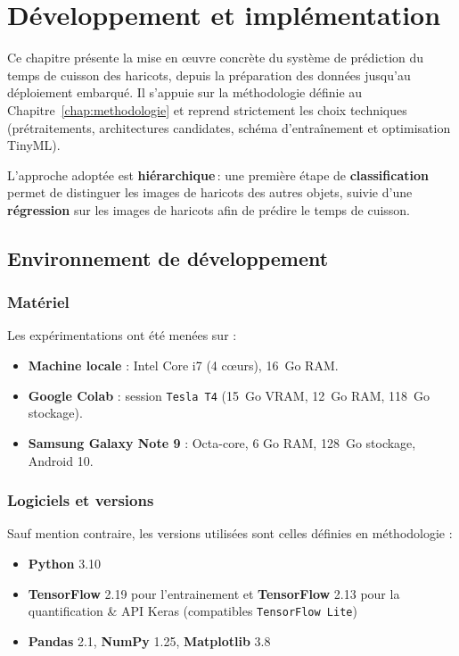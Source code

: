 \chapter{Développement et implémentation}
\label{chap:developpement}

Ce chapitre présente la mise en œuvre concrète du système de prédiction du temps de cuisson des haricots, depuis la préparation des données jusqu’au déploiement embarqué. Il s’appuie sur la méthodologie définie au Chapitre~\ref{chap:methodologie} et reprend strictement les choix techniques (prétraitements, architectures candidates, schéma d’entraînement et optimisation TinyML).

L’approche adoptée est \textbf{hiérarchique} : une première étape de \textbf{classification} permet de distinguer les images de haricots des autres objets, suivie d’une \textbf{régression} sur les images de haricots afin de prédire le temps de cuisson.

\section{Environnement de développement}
\label{sec:env_dev}

\subsection{Matériel}
Les expérimentations ont été menées sur :
\begin{itemize}
	\item \textbf{Machine locale} : Intel Core i7 (4 cœurs), 16~Go RAM.
	\item \textbf{Google Colab} : session \texttt{Tesla T4} (15~Go VRAM, 12~Go RAM, 118~Go stockage).
	\item \textbf{Samsung Galaxy Note 9} : Octa-core, 6 Go RAM, 128~Go stockage, Android 10.
\end{itemize}

\subsection{Logiciels et versions}
Sauf mention contraire, les versions utilisées sont celles définies en méthodologie :
\begin{itemize}
	\item \textbf{Python} 3.10
	\item \textbf{TensorFlow} 2.19 pour l'entrainement et \textbf{TensorFlow} 2.13 pour la quantification \& API Keras (compatibles \texttt{TensorFlow Lite})
	\item \textbf{Pandas} 2.1, \textbf{NumPy} 1.25, \textbf{Matplotlib} 3.8
\end{itemize}

